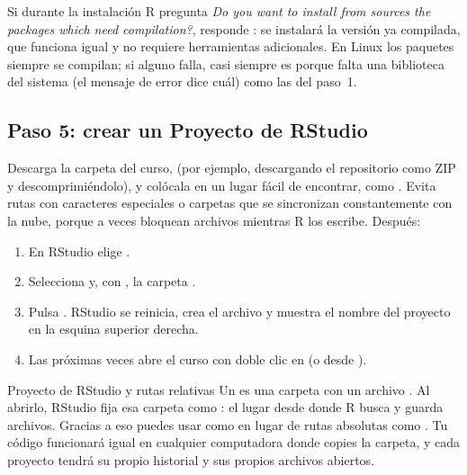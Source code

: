 \begin{advertencia}
Si durante la instalación R pregunta \textit{Do you want to install from
sources the packages which need compilation?}, responde : se
instalará la versión ya compilada, que funciona igual y no requiere
herramientas adicionales. En Linux los paquetes siempre se compilan; si
alguno falla, casi siempre es porque falta una biblioteca del sistema (el
mensaje de error dice cuál) como las del paso~1.
\end{advertencia}

\subsection{Paso 5: crear un Proyecto de RStudio}

Descarga la carpeta del curso,  (por ejemplo,
descargando el repositorio como ZIP y descomprimiéndolo), y colócala en un
lugar fácil de encontrar, como . Evita rutas con
caracteres especiales o carpetas que se sincronizan constantemente con la
nube, porque a veces bloquean archivos mientras R los escribe. Después:

\begin{enumerate}
  \item En RStudio elige .
  \item Selecciona  y, con ,
        la carpeta .
  \item Pulsa . RStudio se reinicia, crea el archivo
         y muestra el nombre del proyecto en
        la esquina superior derecha.
  \item Las próximas veces abre el curso con doble clic en
         (o desde ).
\end{enumerate}

\begin{concepto}{Proyecto de RStudio y rutas relativas}
Un  es una carpeta con un archivo
. Al abrirlo, RStudio fija esa carpeta como
: el lugar desde donde R busca y guarda
archivos. Gracias a eso puedes usar  como
 en lugar de rutas absolutas como
. Tu código funcionará igual en
cualquier computadora donde copies la carpeta, y cada proyecto tendrá su
propio historial y sus propios archivos abiertos.
\end{concepto}

